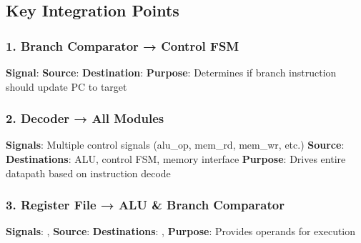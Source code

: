 \subsection{Key Integration Points}\label{cr:fix:cpu-integration-summary:key-integration-points}

\subsubsection{1. Branch Comparator → Control FSM}\label{cr:fix:cpu-integration-summary:1-branch-comparator-control-fsm}

\begin{record}

\textbf{Signal}:  \textbf{Source}:
 \textbf{Destination}:
 \textbf{Purpose}: Determines if branch
instruction should update PC to target

\end{record}

\subsubsection{2. Decoder → All Modules}\label{cr:fix:cpu-integration-summary:2-decoder-all-modules}

\begin{record}

\textbf{Signals}: Multiple control signals (alu\_op, mem\_rd, mem\_wr,
etc.) \textbf{Source}:  \textbf{Destinations}:
ALU, control FSM, memory interface \textbf{Purpose}: Drives entire
datapath based on instruction decode

\end{record}

\subsubsection{3. Register File → ALU \& Branch Comparator}\label{cr:fix:cpu-integration-summary:3-register-file-alu-branch-comparator}

\begin{record}

\textbf{Signals}: ,  \textbf{Source}:
 \textbf{Destinations}: ,
 \textbf{Purpose}: Provides operands for
execution

\end{record}

